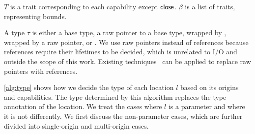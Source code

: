 $T$ is a trait corresponding to each capability except ${\sf close}$.
%
$\beta$ is a list of traits, representing bounds.

A type $\tau$ is either a base type, a raw pointer to a base type, 
wrapped by ,  wrapped by a raw pointer, or .
%
%
%
We use raw pointers instead of references because references require their
lifetimes to be decided, which is unrelated to I/O and outside the scope of this
work.
%
Existing techniques~\cite{emre2021translating, emre2023aliasing,
zhang2023ownership} can be applied to replace raw pointers with references.

\begin{algorithm}[t]
  \caption{Type decision}
  \label{alg:type}
  \footnotesize
\end{algorithm}

\cref{alg:type} shows how we decide the type of each location $l$ based on its
origins and capabilities.
%
The type determined by this algorithm replaces the type annotation of the
location.
%
We treat the cases where $l$ is a parameter and where it is not differently.
%
We first discuss the non-parameter cases, which are further divided into
single-origin and multi-origin cases.

